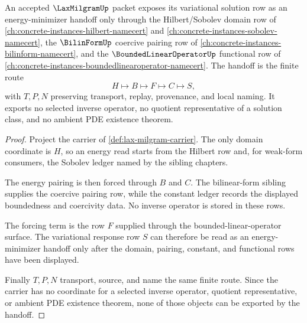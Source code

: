 \begin{theorem}
\label{thm:lax-milgram-energy-minimizer-handoff}
An accepted $\LaxMilgramUp$ packet exposes its variational solution row as an energy-minimizer handoff only through the Hilbert/Sobolev domain row of \autoref{ch:concrete-instances-hilbert-namecert} and \autoref{ch:concrete-instances-sobolev-namecert}, the $\BilinFormUp$ coercive pairing row of \autoref{ch:concrete-instances-bilinform-namecert}, and the $\BoundedLinearOperatorUp$ functional row of \autoref{ch:concrete-instances-boundedlinearoperator-namecert}. The handoff is the finite route
$$
H\longmapsto B\longmapsto F\longmapsto C\longmapsto S ,
$$
with $T,P,N$ preserving transport, replay, provenance, and local naming. It exports no selected inverse operator, no quotient representative of a solution class, and no ambient PDE existence theorem.
\end{theorem}
\begin{proof}
Project the carrier of \autoref{def:lax-milgram-carrier}. The only domain coordinate is $H$, so an energy read starts from the Hilbert row and, for weak-form consumers, the Sobolev ledger named by the sibling chapters.

The energy pairing is then forced through $B$ and $C$. The bilinear-form sibling supplies the coercive pairing row, while the constant ledger records the displayed boundedness and coercivity data. No inverse operator is stored in these rows.

The forcing term is the row $F$ supplied through the bounded-linear-operator surface. The variational response row $S$ can therefore be read as an energy-minimizer handoff only after the domain, pairing, constant, and functional rows have been displayed.

Finally $T,P,N$ transport, source, and name the same finite route. Since the carrier has no coordinate for a selected inverse operator, quotient representative, or ambient PDE existence theorem, none of those objects can be exported by the handoff.
\end{proof}


